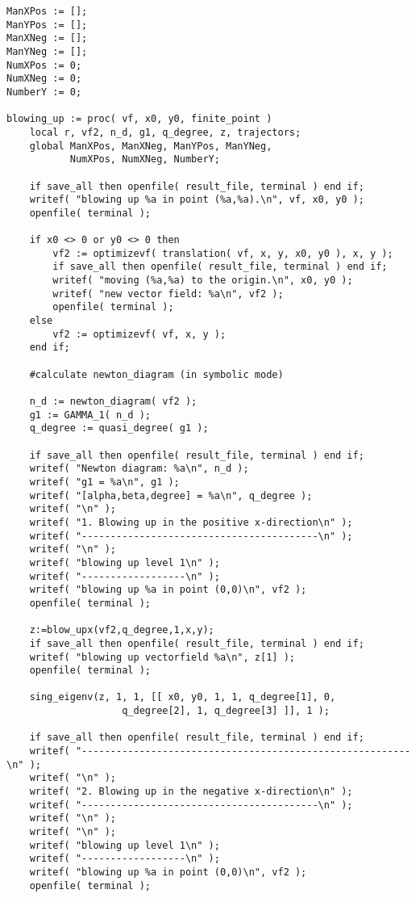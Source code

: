\documentclass[a4paper,10pt]{article}
\begin{document}
\begin{lstlisting}[name=blowup]
ManXPos := [];
ManYPos := [];
ManXNeg := [];
ManYNeg := [];
NumXPos := 0;
NumXNeg := 0;
NumberY := 0;

blowing_up := proc( vf, x0, y0, finite_point )
    local r, vf2, n_d, g1, q_degree, z, trajectors;
    global ManXPos, ManXNeg, ManYPos, ManYNeg,
           NumXPos, NumXNeg, NumberY;

    if save_all then openfile( result_file, terminal ) end if;
    writef( "blowing up %a in point (%a,%a).\n", vf, x0, y0 );
    openfile( terminal );

    if x0 <> 0 or y0 <> 0 then
        vf2 := optimizevf( translation( vf, x, y, x0, y0 ), x, y );
        if save_all then openfile( result_file, terminal ) end if;
        writef( "moving (%a,%a) to the origin.\n", x0, y0 );
        writef( "new vector field: %a\n", vf2 );
        openfile( terminal );
    else
        vf2 := optimizevf( vf, x, y );
    end if;

    #calculate newton_diagram (in symbolic mode)

    n_d := newton_diagram( vf2 );
    g1 := GAMMA_1( n_d );
    q_degree := quasi_degree( g1 );

    if save_all then openfile( result_file, terminal ) end if;
    writef( "Newton diagram: %a\n", n_d );
    writef( "g1 = %a\n", g1 );
    writef( "[alpha,beta,degree] = %a\n", q_degree );
    writef( "\n" );
    writef( "1. Blowing up in the positive x-direction\n" );
    writef( "-----------------------------------------\n" );
    writef( "\n" );
    writef( "blowing up level 1\n" );
    writef( "------------------\n" );
    writef( "blowing up %a in point (0,0)\n", vf2 );
    openfile( terminal );

    z:=blow_upx(vf2,q_degree,1,x,y);
    if save_all then openfile( result_file, terminal ) end if;
    writef( "blowing up vectorfield %a\n", z[1] );
    openfile( terminal );

    sing_eigenv(z, 1, 1, [[ x0, y0, 1, 1, q_degree[1], 0,
                    q_degree[2], 1, q_degree[3] ]], 1 );

    if save_all then openfile( result_file, terminal ) end if;
    writef( "---------------------------------------------------------\n" );
    writef( "\n" );
    writef( "2. Blowing up in the negative x-direction\n" );
    writef( "-----------------------------------------\n" );
    writef( "\n" );
    writef( "\n" );
    writef( "blowing up level 1\n" );
    writef( "------------------\n" );
    writef( "blowing up %a in point (0,0)\n", vf2 );
    openfile( terminal );


\end{lstlisting}
\end{document}

